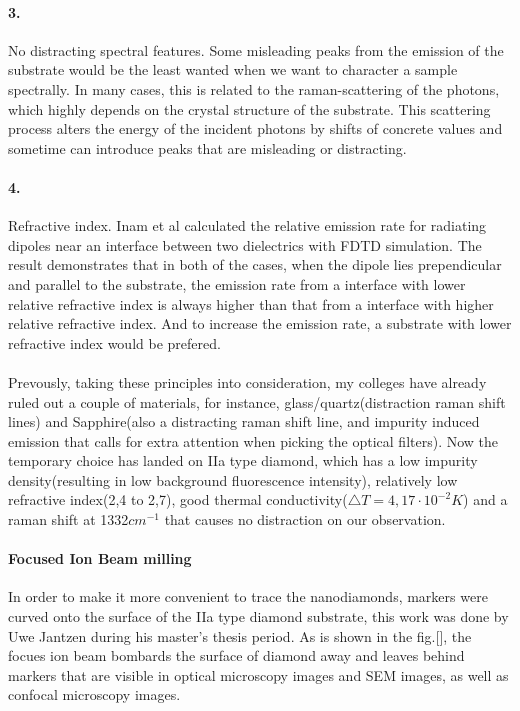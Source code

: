 \paragraph{3.} No distracting spectral features.
Some misleading peaks from the emission of the substrate would be the least wanted when we want to character a sample spectrally. In many cases, this is related to the raman-scattering of the photons, which highly depends on the crystal structure of the substrate. This scattering process alters the energy of the incident photons by shifts of concrete values and sometime can introduce peaks that are misleading or distracting.
\paragraph{4.}Refractive index. Inam et al calculated the relative emission rate for radiating dipoles near an interface between two dielectrics with FDTD simulation. The result demonstrates that in both of the cases, when the dipole lies prependicular and parallel to the substrate, the emission rate from a interface with lower relative refractive index is always higher than that from a interface with higher relative refractive index. And to increase the emission rate, a substrate with lower refractive index would be prefered.
\paragraph{}Prevously, taking these principles into consideration, my colleges have already ruled out a couple of materials, for instance, glass/quartz(distraction raman shift lines) and Sapphire(also a distracting raman shift line, and impurity induced emission that calls for extra attention when picking the optical filters). Now the temporary choice has landed on IIa type diamond, which has a low impurity density(resulting in low background fluorescence intensity), relatively low refractive index(2,4 to 2,7), good thermal conductivity($\bigtriangleup T = 4,17 \cdot 10^{-2}K$) and a raman shift at 1332$cm^{-1} $ that causes no distraction on our observation.

\paragraph{Focused Ion Beam milling}
In order to make it more convenient to trace the nanodiamonds, markers were curved onto the surface of the IIa type diamond substrate, this work was done by Uwe Jantzen during his master's thesis period. As is shown in the fig.[], the focues ion beam bombards the surface of diamond away and leaves behind markers that are visible in optical microscopy images and SEM images, as well as confocal microscopy images.
